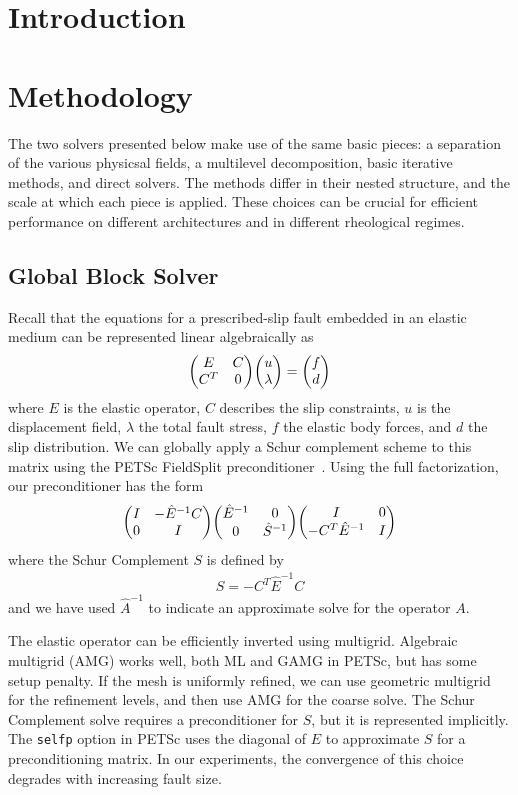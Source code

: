 \documentclass[twoside,leqno,twocolumn]{article}
\begin{document}
\section{Introduction}

\section{Methodology}

The two solvers presented below make use of the same basic pieces: a separation of the various physicsal fields, a multilevel decomposition, basic iterative methods, and direct solvers. The methods differ in their nested structure, and the scale at which each piece is applied. These choices can be crucial for efficient performance on different architectures and in different rheological regimes.

\subsection{Global Block Solver}

Recall that the equations for a prescribed-slip fault embedded in an elastic medium can be represented linear algebraically as
\begin{align}
  \mqty( E & C \\ C^T & 0) \mqty(u \\ \lambda) = \mqty(f \\ d)
\end{align}
where $E$ is the elastic operator, $C$ describes the slip constraints, $u$ is the displacement field, $\lambda$ the total fault stress, $f$ the elastic body forces, and $d$ the slip distribution. We can globally apply a Schur complement scheme to this matrix using the PETSc FieldSplit preconditioner~\cite{petsc-user-ref,bkmms2012}. Using the full factorization, our preconditioner has the form
\begin{align}
  \mqty( I & -\hat E^{-1} C \\ 0 & I) \mqty(\hat E^{-1} & 0 \\ 0 & \hat S^{-1}) \mqty(I & 0 \\ -C^T \hat E^{-1} & I)
\end{align}
where the Schur Complement $S$ is defined by
\begin{align}
  S = -C^T \hat E^{-1} C
\end{align}
and we have used $\hat A^{-1}$ to indicate an approximate solve for the operator $A$.

The elastic operator can be efficiently inverted using multigrid. Algebraic multigrid (AMG) works well, both ML and GAMG in PETSc, but has some setup penalty. If the mesh is uniformly refined, we can use geometric multigrid for the refinement levels, and then use AMG for the coarse solve. The Schur Complement solve requires a preconditioner for $S$, but it is represented implicitly. The \texttt{selfp} option in PETSc uses the diagonal of $E$ to approximate $S$ for a preconditioning matrix. In our experiments, the convergence of this choice degrades with increasing fault size.
\end{document}
